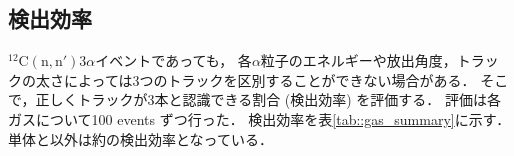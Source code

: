 \documentclass[../master]{subfiles}
\begin{document}
\subsection{検出効率}
${}^{12}\mathrm{C}(\mathrm{n},\mathrm{n}')3\alpha$イベントであっても，
各$\alpha$粒子のエネルギーや放出角度，トラックの太さによっては3つのトラックを区別することができない場合がある．
そこで，正しくトラックが3本と認識できる割合 (検出効率) を評価する．
評価は各ガスについて100 events ずつ行った．
検出効率を表\ref{tab::gas_summary}に示す．
\Methane 単体と\MethaneHerium 以外は約の検出効率となっている．

\end{document}
